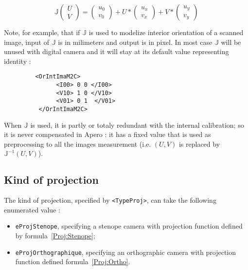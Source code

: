 \begin{equation}
  \mathbb{J}  \begin{pmatrix} U \\ V \end{pmatrix}
              = \begin{pmatrix} u_0 \\ v_0 \end{pmatrix}
               + U * \begin{pmatrix} u_x \\ v_x \end{pmatrix}
               + V * \begin{pmatrix} u_y \\ v_y \end{pmatrix}
\end{equation}

Note, for example, that if $\mathbb{J}$ is used to modelize interior orientation
of a scanned image, input of  $\mathbb{J}$  is in milimeters and output is in pixel.
In most case $\mathbb{J}$ will be unused with digital camera and it will stay at
its default value representing identity :

\begin{verbatim}
         <OrIntImaM2C>
               <I00> 0 0 </I00>
               <V10> 1 0 </V10>
               <V01> 0 1  </V01>
          </OrIntImaM2C>
\end{verbatim}

When  $\mathbb{J}$  is used, it is partly or totaly redundant with the internal
calibration; so it is never compensated in Apero : it has a fixed value that is used
as preprocessing to all the images measurement (i.e. $(U,V)$ is replaced by
 $\mathbb{J}^{-1}(U,V)$).




\subsection{Kind of projection}

The kind of projection,  specified by  {\tt <TypeProj>}, can take the following
enumerated value :

\begin{itemize}
   \item {\tt eProjStenope}, specifying a stenope camera with projection function defined
         by formula~\ref{Proj:Stenope};

   \item {\tt eProjOrthographique}, specifying an orthographic camera with projection function defined
         formula~\ref{Proj:Ortho}.

\end{itemize}


